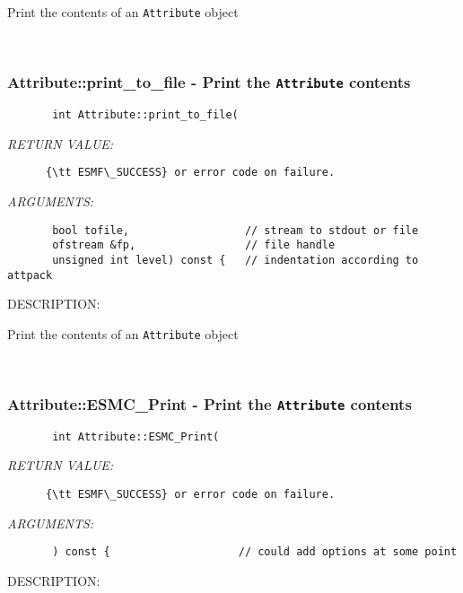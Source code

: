        Print the contents of an {\tt Attribute} object
   
 
\mbox{}\hrulefill\
 
\subsubsection [Attribute::print\_to\_file] {Attribute::print\_to\_file - Print the {\tt Attribute} contents}


  
\begin{verbatim}       int Attribute::print_to_file(\end{verbatim}{\em RETURN VALUE:}
\begin{verbatim}      {\tt ESMF\_SUCCESS} or error code on failure.\end{verbatim}{\em ARGUMENTS:}
\begin{verbatim}       bool tofile,                  // stream to stdout or file
       ofstream &fp,                 // file handle
       unsigned int level) const {   // indentation according to attpack\end{verbatim}
{\sf DESCRIPTION:\\ }


       Print the contents of an {\tt Attribute} object
   
 
\mbox{}\hrulefill\
 
\subsubsection [Attribute::ESMC\_Print] {Attribute::ESMC\_Print - Print the {\tt Attribute} contents}


  
\begin{verbatim}       int Attribute::ESMC_Print(\end{verbatim}{\em RETURN VALUE:}
\begin{verbatim}      {\tt ESMF\_SUCCESS} or error code on failure.\end{verbatim}{\em ARGUMENTS:}
\begin{verbatim}       ) const {                    // could add options at some point\end{verbatim}
{\sf DESCRIPTION:\\ }


